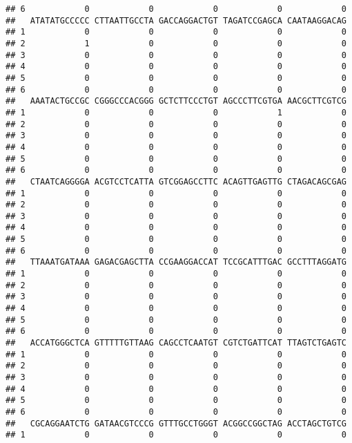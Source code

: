 \documentclass[]{article}
\begin{document}
\begin{verbatim}
## 6            0            0            0            0            0
##   ATATATGCCCCC CTTAATTGCCTA GACCAGGACTGT TAGATCCGAGCA CAATAAGGACAG
## 1            0            0            0            0            0
## 2            1            0            0            0            0
## 3            0            0            0            0            0
## 4            0            0            0            0            0
## 5            0            0            0            0            0
## 6            0            0            0            0            0
##   AAATACTGCCGC CGGGCCCACGGG GCTCTTCCCTGT AGCCCTTCGTGA AACGCTTCGTCG
## 1            0            0            0            1            0
## 2            0            0            0            0            0
## 3            0            0            0            0            0
## 4            0            0            0            0            0
## 5            0            0            0            0            0
## 6            0            0            0            0            0
##   CTAATCAGGGGA ACGTCCTCATTA GTCGGAGCCTTC ACAGTTGAGTTG CTAGACAGCGAG
## 1            0            0            0            0            0
## 2            0            0            0            0            0
## 3            0            0            0            0            0
## 4            0            0            0            0            0
## 5            0            0            0            0            0
## 6            0            0            0            0            0
##   TTAAATGATAAA GAGACGAGCTTA CCGAAGGACCAT TCCGCATTTGAC GCCTTTAGGATG
## 1            0            0            0            0            0
## 2            0            0            0            0            0
## 3            0            0            0            0            0
## 4            0            0            0            0            0
## 5            0            0            0            0            0
## 6            0            0            0            0            0
##   ACCATGGGCTCA GTTTTTGTTAAG CAGCCTCAATGT CGTCTGATTCAT TTAGTCTGAGTC
## 1            0            0            0            0            0
## 2            0            0            0            0            0
## 3            0            0            0            0            0
## 4            0            0            0            0            0
## 5            0            0            0            0            0
## 6            0            0            0            0            0
##   CGCAGGAATCTG GATAACGTCCCG GTTTGCCTGGGT ACGGCCGGCTAG ACCTAGCTGTCG
## 1            0            0            0            0            0

\end{verbatim}
\end{document}
